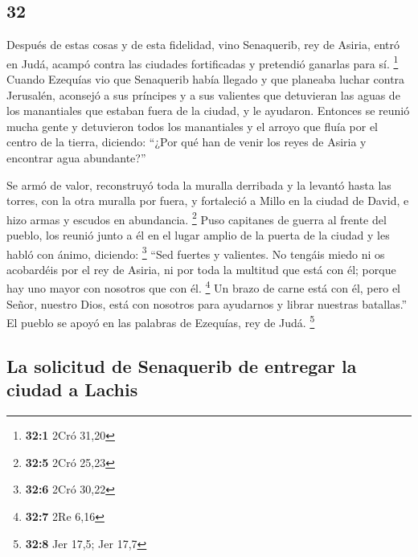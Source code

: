 \begin{paracol}{2}
\hypertarget{section-62}{%
\section{32}\label{section-62}}

 Después de estas cosas y de esta fidelidad, vino
Senaquerib, rey de Asiria, entró en Judá, acampó contra las ciudades
fortificadas y pretendió ganarlas para sí. \footnote{\textbf{32:1} 2Cró
  31,20}  Cuando Ezequías vio que Senaquerib había llegado
y que planeaba luchar contra Jerusalén,  aconsejó a sus
príncipes y a sus valientes que detuvieran las aguas de los manantiales
que estaban fuera de la ciudad, y le ayudaron.  Entonces
se reunió mucha gente y detuvieron todos los manantiales y el arroyo que
fluía por el centro de la tierra, diciendo: ``¿Por qué han de venir los
reyes de Asiria y encontrar agua abundante?''

 Se armó de valor, reconstruyó toda la muralla derribada y
la levantó hasta las torres, con la otra muralla por fuera, y fortaleció
a Millo en la ciudad de David, e hizo armas y escudos en abundancia.
\footnote{\textbf{32:5} 2Cró 25,23}  Puso capitanes de
guerra al frente del pueblo, los reunió junto a él en el lugar amplio de
la puerta de la ciudad y les habló con ánimo, diciendo: \footnote{\textbf{32:6}
  2Cró 30,22}  ``Sed fuertes y valientes. No tengáis miedo
ni os acobardéis por el rey de Asiria, ni por toda la multitud que está
con él; porque hay uno mayor con nosotros que con él. \footnote{\textbf{32:7}
  2Re 6,16}  Un brazo de carne está con él, pero el Señor,
nuestro Dios, está con nosotros para ayudarnos y librar nuestras
batallas.'' El pueblo se apoyó en las palabras de Ezequías, rey de Judá.
\footnote{\textbf{32:8} Jer 17,5; Jer 17,7}

\hypertarget{la-solicitud-de-senaquerib-de-entregar-la-ciudad-a-lachis}{%
\subsection{La solicitud de Senaquerib de entregar la ciudad a
Lachis}\label{la-solicitud-de-senaquerib-de-entregar-la-ciudad-a-lachis}}


\end{paracol}
